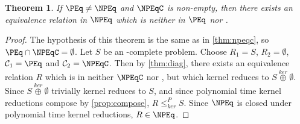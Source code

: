 \documentclass{article}
\newtheorem{theorem}{Theorem}[section]
\theoremstyle{definition} \newtheorem{definition}[definition]{Definition}
\newcommand{\kj}{\overset{ker}{\oplus}} %
\newcommand{\kr}{\leq^{P}_{ker}} %
\begin{document}
\begin{theorem}
  If $\PEq\neq\NPEq$ and $\NPEqC$ is non-empty, then there exists an
  equivalence relation in $\NPEq$ which is neither in $\PEq$ nor \NPEqC.
\end{theorem}
\begin{proof}
  The hypothesis of this theorem is the same as in \autoref{thm:npeqc}, so
  $\PEq\cap\NPEqC=\emptyset$. Let $S$ be an \NPEq-complete problem. Choose
  $R_1=S$, $R_2=\emptyset$, $\mathcal{C}_1=\PEq$ and
  $\mathcal{C}_2=\NPEqC$. Then by \autoref{thm:diag}, there exists an
  equivalence relation $R$ which is in neither $\NPEqC$ nor \PEq, but which
  kernel reduces to $S\kj\emptyset$. Since $S\kj\emptyset$ trivially kernel
  reduces to $S$, and since polynomial time kernel reductions compose by
  \autoref{prop:compose}, $R\kr S$. Since $\NPEq$ is closed under polynomial
  time kernel reductions, $R\in\NPEq$.
\end{proof}

 
\end{document}
